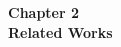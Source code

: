 \begin{center}

    \thispagestyle{empty}
    \vspace*{\fill}
    
    \Huge 
    \textbf{Chapter 2\\  Related Works}
       

    \vspace*{\fill}
\end{center}